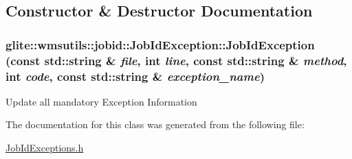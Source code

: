 \subsection{Constructor \& Destructor Documentation}
\hypertarget{classglite_1_1wmsutils_1_1jobid_1_1JobIdException_a0}{
\subsubsection[JobIdException]{\setlength{\rightskip}{0pt plus 5cm}glite::wmsutils::jobid::Job\-Id\-Exception::Job\-Id\-Exception (const std::string \& {\em file}, int {\em line}, const std::string \& {\em method}, int {\em code}, const std::string \& {\em exception\_\-name})}}
\label{classglite_1_1wmsutils_1_1jobid_1_1JobIdException_a0}


Update all mandatory Exception Information 

The documentation for this class was generated from the following file:\begin{CompactItemize}
\item 
\hyperlink{JobIdExceptions_8h}{Job\-Id\-Exceptions.h}\end{CompactItemize}
